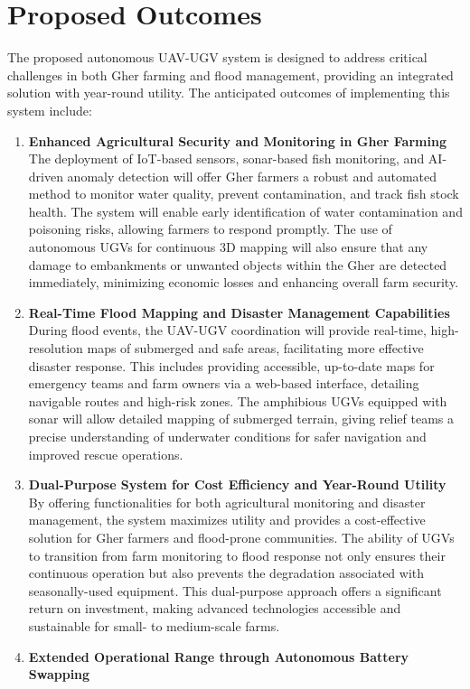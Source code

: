 \documentclass[conference]{IEEEtran}
\begin{document}
\section{\textbf{Proposed Outcomes}}
The proposed autonomous UAV-UGV system is designed to address critical challenges in both Gher farming and flood management, providing an integrated solution with year-round utility. The anticipated outcomes of implementing this system include:
\begin{enumerate}
	\item \textbf{Enhanced Agricultural Security and Monitoring in Gher Farming}
	The deployment of IoT-based sensors, sonar-based fish monitoring, and AI-driven anomaly detection will offer Gher farmers a robust and automated method to monitor water quality, prevent contamination, and track fish stock health. The system will enable early identification of water contamination and poisoning risks, allowing farmers to respond promptly. The use of autonomous UGVs for continuous 3D mapping will also ensure that any damage to embankments or unwanted objects within the Gher are detected immediately, minimizing economic losses and enhancing overall farm security.
	\item \textbf{Real-Time Flood Mapping and Disaster Management Capabilities}
	During flood events, the UAV-UGV coordination will provide real-time, high-resolution maps of submerged and safe areas, facilitating more effective disaster response. This includes providing accessible, up-to-date maps for emergency teams and farm owners via a web-based interface, detailing navigable routes and high-risk zones. The amphibious UGVs equipped with sonar will allow detailed mapping of submerged terrain, giving relief teams a precise understanding of underwater conditions for safer navigation and improved rescue operations.
	\item \textbf{Dual-Purpose System for Cost Efficiency and Year-Round Utility}
	By offering functionalities for both agricultural monitoring and disaster management, the system maximizes utility and provides a cost-effective solution for Gher farmers and flood-prone communities. The ability of UGVs to transition from farm monitoring to flood response not only ensures their continuous operation but also prevents the degradation associated with seasonally-used equipment. This dual-purpose approach offers a significant return on investment, making advanced technologies accessible and sustainable for small- to medium-scale farms.
	\item \textbf{Extended Operational Range through Autonomous Battery Swapping}

\end{enumerate}
\end{document}

